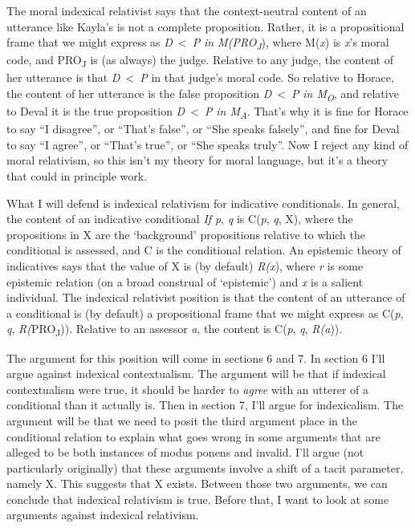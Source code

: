 \documentclass[
  11pt,
  letterpaper,
  DIV=11,
  numbers=noendperiod,
  oneside]{scrartcl}
\begin{document}
The moral indexical relativist says that the context-neutral content of
an utterance like Kayla's is not a complete proposition. Rather, it is a
propositional frame that we might express as \emph{D}~\textless~\emph{P}
\emph{in M(PRO\textsubscript{J}}), where M(\emph{x}) is \emph{x}'s moral
code, and PRO\textsubscript{J} is (as always) the judge. Relative to any
judge, the content of her utterance is that \emph{D}~\textless~\emph{P}
in that judge's moral code. So relative to Horace, the content of her
utterance is the false proposition \emph{D}~\textless~\emph{P} \emph{in
M\textsubscript{O}}, and relative to Deval it is the true proposition
\emph{D}~\textless~\emph{P} \emph{in M\textsubscript{A}}. That's why it
is fine for Horace to say ``I disagree'', or ``That's false'', or ``She
speaks falsely'', and fine for Deval to say ``I agree'', or ``That's
true'', or ``She speaks truly''. Now I reject any kind of moral
relativism, so this isn't my theory for moral language, but it's a
theory that could in principle work.

What I will defend is indexical relativism for indicative conditionals.
In general, the content of an indicative conditional \emph{If p},
\emph{q} is C(\emph{p}, \emph{q}, X), where the propositions in X are
the `background' propositions relative to which the conditional is
assessed, and C is the conditional relation.
An epistemic theory of indicatives says that the value of X is (by
default) \emph{R(x}), where \emph{r} is some epistemic relation (on a
broad construal of `epistemic') and \emph{x} is a salient individual.
The indexical relativist position is that the content of an utterance of
a conditional is (by default) a propositional frame that we might
express as C(\emph{p}, \emph{q}, \emph{R(}PRO\textsubscript{J})).
Relative to an assessor \emph{a}, the content is C(\emph{p}, \emph{q},
\emph{R(a})).

The argument for this position will come in sections 6 and 7. In section
6 I'll argue against indexical contextualism. The argument will be that
if indexical contextualism were true, it should be harder to
\emph{agree} with an utterer of a conditional than it actually is. Then
in section 7, I'll argue for indexicalism. The argument will be that we
need to posit the third argument place in the conditional relation to
explain what goes wrong in some arguments that are alleged to be both
instances of modus ponens and invalid. I'll argue (not particularly
originally) that these arguments involve a shift of a tacit parameter,
namely X. This suggests that X exists. Between those two arguments, we
can conclude that indexical relativism is true. Before that, I want to
look at some arguments against indexical relativism.
\end{document}
